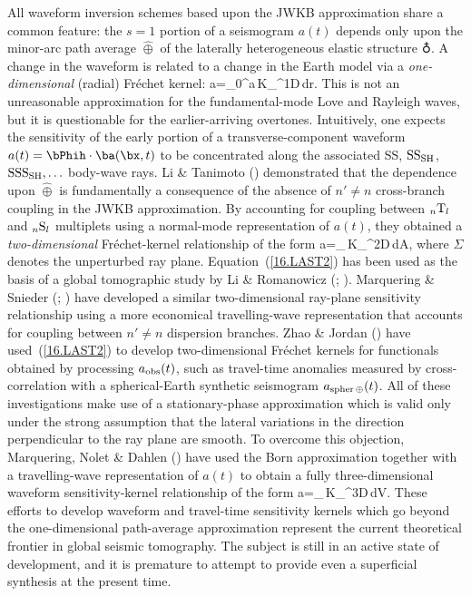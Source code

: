 All waveform inversion schemes based upon the JWKB approximation
share a common feature: the $s=1$ portion of a seismogram
$a(t)$ depends only upon the minor-arc path average
$\hat{\oplus}$ of the laterally heterogeneous elastic
structure $\earth$.  A change in the waveform
is related to a change in the Earth model via a {\em one-dimensional\/}
%
(radial) Fr\'{e}chet kernel:
\eq \label{16.LAST1}
\delta a=\int_0^a\delta\hat{\oplus}\,K_{\subearth}^{\rm 1D}\,dr.
\en
This is not an unreasonable approximation
for the fundamental-mode Love and Rayleigh waves,
but it is questionable for the earlier-arriving overtones.
Intuitively, one expects the sensitivity
of the early portion of a transverse-component
waveform $a(t)=\bPhih\cdot\ba(\bx,t)$
to be concentrated along the
associated SS, ${\rm SS}_{\rm SH}$,
${\rm SSS}_{\rm SH},\ldots$ body-wave rays.  Li \& Tanimoto
(\citeyear{li&tanimoto93}) demonstrated that the dependence
upon $\hat{\oplus}$ is fundamentally a consequence of the
absence of $n'\not=n$ cross-branch coupling in the JWKB
approximation.  By accounting for coupling between
${}_n{\rm T}_l$ and ${}_n{\rm S}_l$ multiplets
using a normal-mode representation of $a(t)$,
they obtained a {\em two-dimensional\/}
%
Fr\'{e}chet-kernel relationship of the form
\eq \label{16.LAST2}
\delta a=\int_{\Sigma}\delta\earth\,K_{\subearth}^{\rm 2D}\,dA,
\en
where $\Sigma$ denotes the unperturbed ray plane.
Equation~(\ref{16.LAST2}) has been used as the basis
of a global tomographic study by Li \& Romanowicz
(\citeyear{li&romanowicz95}; \citeyear{li&romanowicz96}).
Marquering \& Snieder (\citeyear{marquering&snieder95};
\citeyear{marquering&snieder96}) have developed a similar
two-dimensional ray-plane sensitivity relationship using
a more economical travelling-wave representation that accounts
for coupling between $n'\not= n$ dispersion branches.
Zhao \& Jordan (\citeyear{zhao&jordan97})
have used~(\ref{16.LAST2}) to develop
two-dimensional Fr\'{e}chet kernels for functionals
obtained by processing $a_{\rm obs}(t)$, such as travel-time anomalies
measured by cross-correlation with a spherical-Earth synthetic seismogram
$a_{\rm spher\,\oplus}(t)$.  
All of these investigations make use of
a stationary-phase approximation
which is valid only under the strong assumption that
the lateral variations in the direction perpendicular to the ray plane
are smooth.  To overcome this objection, Marquering, Nolet
\& Dahlen (\citeyear{marquering&al97}) have used the Born
approximation together with a travelling-wave representation
of $a(t)$ to obtain a fully three-dimensional waveform
sensitivity-kernel relationship of the form
\eq \label{16.LAST3}
\delta a=\int_{\subearth}\delta\earth\,K_{\subearth}^{\rm 3D}\,dV.
\en
These efforts to develop waveform and travel-time sensitivity
kernels which go beyond the one-dimensional path-average approximation
represent the current theoretical frontier in global seismic
tomography.  The subject is still in an active state of
development, and it is premature to attempt to provide
even a superficial synthesis at the present time.
%
%
